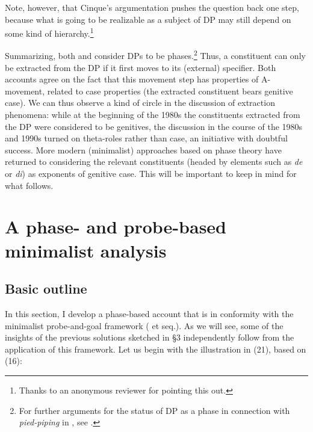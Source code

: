 \documentclass[output=paper]{langsci/langscibook}
\begin{document}
Note, however, that Cinque’s argumentation pushes the question back one step, because what is going to be realizable as a subject of DP may still depend on some kind of hierarchy.\footnote{Thanks to an anonymous reviewer for pointing this out.}

Summarizing, both \citet{Gutiérrez-Bravo2001} and \citet{Cinque2014} consider DPs to be phases.\footnote{For further arguments for the status of DP as a phase in connection with \textit{pied-piping} in , see \citet{Heck2008}.} Thus, a constituent can only be extracted from the DP if it first moves to its (external) specifier. Both accounts agree on the fact that this movement step has properties of A-movement, related to case properties (the extracted constituent bears genitive case). We can thus observe a kind of circle in the discussion of  extraction phenomena: while at the beginning of the 1980s the constituents extracted from the DP were considered to be genitives, the discussion in the course of the 1980s and 1990s turned on theta-roles rather than case, an initiative with doubtful success. More modern (minimalist) approaches based on phase theory have returned to considering the relevant constituents (headed by elements such as  \textit{de} or  \textit{di}) as exponents of genitive case. This will be important to keep in mind for what follows.

\section{A phase- and probe-based minimalist analysis} %

\subsection{Basic outline}%

In this section, I develop a phase-based account that is in conformity with the minimalist probe-and-goal framework (\citealt{Chomsky2000} et seq.). As we will see, some of the insights of the previous solutions sketched in §3 independently follow from the application of this framework. Let us begin with the illustration in (21), based on (16):
\end{document}
